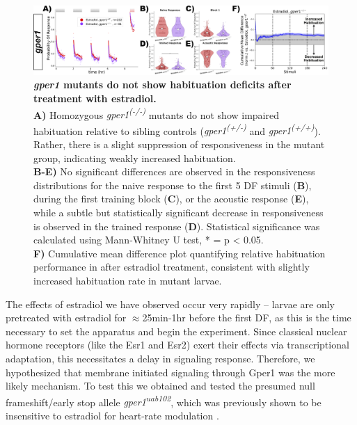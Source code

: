 \documentclass[9pt,lineno]{RandlettLab_elife}
\begin{document}
{\begin{figure}
\begin{fullwidth}
\begin{center}
\includegraphics[width=0.95\linewidth]{figures/gper1Mutants.png}
\caption{\textbf{\emph{gper1} mutants do not show habituation deficits after treatment with estradiol.}
\\ \textbf{A)} Homozygous \emph{gper1\textsuperscript{(-/-)}} mutants do not show impaired habituation relative to sibling controls (\emph{gper1\textsuperscript{(+/-)}} and \emph{gper1\textsuperscript{(+/+)}}). Rather, there is a slight suppression of responsiveness in the mutant group, indicating weakly increased habituation. 
\\ \textbf{B-E)} No significant differences are observed in the responsiveness distributions for the naive response to the first 5 DF stimuli (\textbf{B}), during the first training block (\textbf{C}), or the acoustic response (\textbf{E}), while a subtle but statistically significant decrease in responsiveness is observed in the trained response (\textbf{D}). Statistical significance was calculated using Mann-Whitney U test, * = p < 0.05.
\\ \textbf{F)} Cumulative mean difference plot quantifying relative habituation performance in  after estradiol treatment, consistent with slightly increased habituation rate in mutant larvae. 
}
\label{fig:2}

\end{center}
\end{fullwidth}
\end{figure}

The effects of estradiol we have observed occur very rapidly -- larvae are only pretreated with estradiol for $\approx$25min-1hr before the first DF, as this is the time necessary to set the apparatus and begin the experiment.
Since classical nuclear hormone receptors (like the Esr1 and Esr2) exert their effects via transcriptional adaptation, this necessitates a delay in signaling response. 
Therefore, we hypothesized that membrane initiated signaling through Gper1 was the more likely mechanism. 
To test this we obtained and tested the presumed null frameshift/early stop allele \emph{gper1\textsuperscript{uab102}}, which was previously shown to be insensitive to estradiol for heart-rate modulation \citep{Romano2017-ep}. 

}
\end{document}
